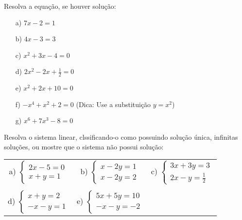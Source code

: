  Resolva a equação, se houver solução:

\begin{itemize}

\item[a)]$7x-2=1$
\item[b)]$4x-3=3$
\item[c)]$x^2+3x-4=0$
\item[d)]$2x^2-2x+\frac{1}{2}=0$
\item[e)]$x^2+2x+10=0$
\item[f)]$-x^4+x^2+2=0$ (Dica: Use a substituição $y=x^2$)
\item[g)] $x^6+7x^3-8=0$

\end{itemize}

 Resolva o sistema linear, clssificando-o como possuindo solução única, infinitas soluções,
 ou mostre que o sistema não possui solução:
\vspace{0.5cm}

\begin{tabular}{ccc}
a) $\left\{\begin{array}{c}
2x-5=0\\
x+y=1
\end{array}\right.$
&
\hspace{1cm} b) $\left\{\begin{array}{c}
x-2y=1\\
x-2y=2
\end{array}\right.
$
&
\hspace{1cm} c) $\left\{\begin{array}{c}
3x+3y=3\\
2x-y=\frac{1}{2}
\end{array}\right.
$ \\
\\ d) $\left\{\begin{array}{c}
x+y=2\\
-x-y=1
\end{array}\right.
$
&
\hspace{1cm} e) $\left\{\begin{array}{c}
5x+5y=10\\
-x-y=-2
\end{array}\right.
$
\end{tabular}
